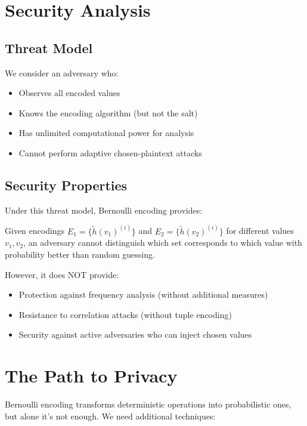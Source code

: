 \section{Security Analysis}

\subsection{Threat Model}

We consider an adversary who:
\begin{itemize}
\item Observes all encoded values
\item Knows the encoding algorithm (but not the salt)
\item Has unlimited computational power for analysis
\item Cannot perform adaptive chosen-plaintext attacks
\end{itemize}

\subsection{Security Properties}

Under this threat model, Bernoulli encoding provides:

\begin{theorem}
Given encodings $E_1 = \{\tilde{h}(v_1)^{(i)}\}$ and $E_2 = \{\tilde{h}(v_2)^{(i)}\}$ for different values $v_1, v_2$, an adversary cannot distinguish which set corresponds to which value with probability better than random guessing.
\end{theorem}

However, it does NOT provide:
\begin{itemize}
\item Protection against frequency analysis (without additional measures)
\item Resistance to correlation attacks (without tuple encoding)
\item Security against active adversaries who can inject chosen values
\end{itemize}

\section{The Path to Privacy}

Bernoulli encoding transforms deterministic operations into probabilistic ones, but alone it's not enough. We need additional techniques:

